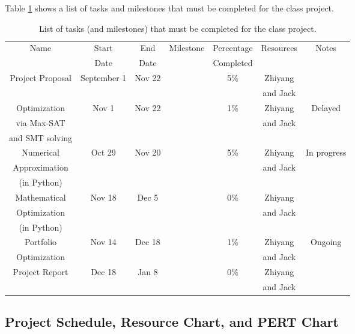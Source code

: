 \documentclass[letter,12pt]{article}
\begin{document}
Table \ref{tab:tasklisttable} shows a list of tasks and milestones that must be completed for the class project.


\begin{table}%
\caption{List of tasks (and milestones) that must be completed for the class project.}
\begin{center}
	\begin{tabular}[b]{|c|c|c|c|c|c|c|}\hline
	\label{tab:tasklisttable}
		Name & Start & End & Milestone & Percentage & Resources & Notes \\
		 & Date & Date &  & Completed &  &  \\
		\hline
		Project Proposal & September 1 & Nov 22 & \checkmark & 5\% & Zhiyang & \\
		 &  &  &  &  & and Jack &  \\
		 \hline
		Optimization & Nov 1 & Nov 22 & \checkmark & 1\% & Zhiyang & Delayed \\
		via Max-SAT &  &  &  &  & and Jack &  \\
		and SMT solving &  &  &  &  &  &  \\
		\hline
		Numerical & Oct 29 & Nov 20 &  & 5\% & Zhiyang & In progress \\
		Approximation &  &  &  &  & and Jack &  \\
		(in Python) &  &  &  &  &  &  \\
		\hline
		Mathematical & Nov 18 & Dec 5 & \checkmark & 0\% & Zhiyang &  \\
		Optimization &  &  &  &  & and Jack &  \\
		(in Python) &  &  &  &  &  &  \\
		\hline
		Portfolio & Nov 14 & Dec 18 & \checkmark & 1\% & Zhiyang & Ongoing \\
		Optimization &  &  &  &  & and Jack &  \\
		\hline
		Project Report & Dec 18 & Jan 8 & \checkmark & 0\% & Zhiyang & \\
		 &  &  &  &  & and Jack &  \\
	\hline
	\end{tabular}
\end{center}
\end{table}





\subsection{Project Schedule, Resource Chart, and PERT Chart}
\label{ssec:projscheduleandresourcenpertcharts}
\end{document}
